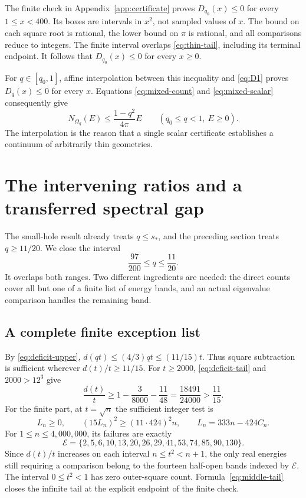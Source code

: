 \documentclass[11pt,reqno]{amsart}
\numberwithin{equation}{section}
\newcommand{\Om}{\Omega}
\newcommand{\sstar}{s_*}
\begin{document}
The finite check in Appendix~\ref{app:certificate} proves
$D_{q_0}(x)\le0$ for every $1\le x<400$. Its boxes are
intervals in $x^2$, not sampled values of $x$. The bound on
each square root is rational, the lower bound on $\pi$ is
rational, and all comparisons reduce to integers. The finite
interval overlaps \eqref{eq:thin-tail}, including its terminal
endpoint. It follows that $D_{q_0}(x)\le0$ for every $x\ge0$.

For $q\in[q_0,1]$, affine interpolation between this inequality
and \eqref{eq:D1} proves $D_q(x)\le0$ for every $x$. Equations
\eqref{eq:mixed-count} and \eqref{eq:mixed-scalar} consequently give
\begin{equation}\label{eq:thin-conclusion}
 N_{\Om_q}(E)\le\frac{1-q^2}{4\pi}E
 \qquad(q_0\le q<1,\ E\ge0).
\end{equation}
The interpolation is the reason that a single scalar
certificate establishes a continuum of arbitrarily thin
geometries.

\section{The intervening ratios and a transferred spectral gap}\label{sec:middle}

The small-hole result already treats $q\le\sstar$, and the
preceding section treats $q\ge11/20$. We close the interval
\begin{equation}\label{eq:q-middle}
 \frac{97}{200}\le q\le\frac{11}{20}.
\end{equation}
It overlaps both ranges. Two different ingredients are needed:
the direct counts cover all but one of a finite list of
energy bands, and an actual eigenvalue comparison handles the
remaining band.

\subsection*{A complete finite exception list}

By \eqref{eq:deficit-upper},
$d(qt)\le(4/3)qt\le(11/15)t$. Thus square subtraction is
sufficient wherever $d(t)/t\ge11/15$.
For $t\ge2000$, \eqref{eq:deficit-tail} and $2000>12^3$ give
\begin{equation}\label{eq:middle-tail}
 \frac{d(t)}t\ge1-\frac3{8000}-\frac{11}{48}
 =\frac{18491}{24000}>\frac{11}{15}.
\end{equation}
For the finite part, at $t=\sqrt n$ the sufficient integer test is
\begin{equation}\label{eq:middle-test}
 L_n\ge0,
 \qquad(15L_n)^2\ge(11\cdot424)^2n,
 \qquad L_n=333n-424C_n.
\end{equation}
For $1\le n\le4{,}000{,}000$, its failures are exactly
\begin{equation}\label{eq:exception-list}
 \mathcal E=\{2,5,6,10,13,20,26,29,41,53,74,85,90,130\}.
\end{equation}
Since $d(t)/t$ increases on each interval
$n\le t^2<n+1$, the only real energies still requiring a
comparison belong to the fourteen half-open bands indexed by
$\mathcal E$. The interval $0\le t^2<1$ has zero outer-square
count. Formula~\eqref{eq:middle-tail} closes the infinite tail
at the explicit endpoint of the finite check.
\end{document}
